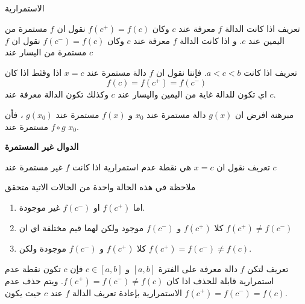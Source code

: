 	\begin{frame}{الاستمرارية}
		\begin{exampleblock}{تعريف}
				اذا كانت الدالة $f$ معرفة عند $c$ وكان $f(c^+) = f(c)$ نقول ان $f$ مستمرة من اليمين عند $c$. و اذا كانت الدالة $f$ معرفة عند $c$ وكان $f(c^-) = f(c)$ نقول ان $f$ مستمرة من اليسار عند $c$
		\end{exampleblock}
		
		\pause
		\begin{exampleblock}{تعريف}
				اذا كانت $a<c<b$. فإننا نقول ان $f$ دالة مستمرة عند $x=c$ اذا وقثط اذا  كان
			\[
			f(c) = f(c^+) = f(c^-)
			\]
			اي تكون للدالة غاية من اليمين واليسار عند $c$ وكذلك تكون الدالة معرفة عند $c$.
		\end{exampleblock}
		
		\pause
		\begin{exampleblock}{مبرهنة}
				افرض ان $g(x)$ دالة مستمرة عند $x_0 $ و $f(x)$ مستمرة عند $g(x_0)$  ، فأن $f\circ g$ مستمرة عند $x_0$.
		\end{exampleblock}
	\end{frame}

	
	\begin{frame}
		\Huge
		\begin{center}
			\textbf{الدوال غير المستمرة}
		\end{center}
	\end{frame}
	
	\begin{frame}
		\begin{exampleblock}{تعريف}
				نقول  ان $x=c$ هي نقطة عدم استمرارية اذا كانت $f$ غير مستمرة عند $c$
		\end{exampleblock}
		
		\pause
		\begin{exampleblock}{ملاحظة}
			في هذه الحالة واحدة من الحالات الاتية متحقق
			\begin{enumerate}
				\item اما $f(c^+)$ او $f(c^-)$ غير موجودة.
				\item كلا $f(c^+)$ و $f(c^-)$ موجود ولكن لهما قيم مختلفة اي ان $f(c^+) \neq f(c^-)$
				\item كلا $f(c^+)$ و $f(c^-)$ موجودة ولكن $f(c^+) = f(c^-) \neq f(c)$.
			\end{enumerate}
		\end{exampleblock}
		
		\pause
		\begin{exampleblock}{تعريف}
				لتكن $f$ دالة معرفة على الفترة $[a, b]$ و $c\in [a, b]$ فإن $c$ تكون نقطة عدم استمرارية قابلة للحذف اذا كان $f(c^+) = f(c^-) \neq f(c)$. ويتم حذف عدم الاستمرارية بإعادة تعريف الدالة $f$ عند $c$ حيث يكون  $f(c^+) = f(c^-) = f(c)$.
		\end{exampleblock}
	\end{frame}
	

